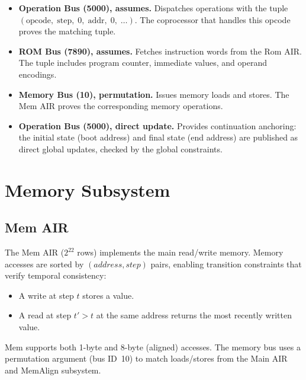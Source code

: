 \begin{itemize}[nosep]
  \item \textbf{Operation Bus (5000), assumes.}
        Dispatches operations with the tuple
        $(\mathrm{opcode},\; \mathrm{step},\; 0,\; \mathrm{addr},\; 0,\; \ldots)$.
        The coprocessor that handles this opcode proves the matching tuple.

  \item \textbf{ROM Bus (7890), assumes.}
        Fetches instruction words from the Rom AIR.
        The tuple includes program counter, immediate values,
        and operand encodings.

  \item \textbf{Memory Bus (10), permutation.}
        Issues memory loads and stores.
        The Mem AIR proves the corresponding memory operations.

  \item \textbf{Operation Bus (5000), direct update.}
        Provides continuation anchoring: the initial state (boot address)
        and final state (end address) are published as direct global updates,
        checked by the global constraints.
\end{itemize}

\section{Memory Subsystem}
\label{sec:memory}

\subsection{Mem AIR}
\label{sec:mem}

The Mem AIR ($2^{22}$ rows) implements the main read/write memory.
Memory accesses are sorted by $(address, step)$ pairs,
enabling transition constraints that verify temporal consistency:
\begin{itemize}[nosep]
  \item A write at step $t$ stores a value.
  \item A read at step $t' > t$ at the same address returns the most recently written value.
\end{itemize}

Mem supports both 1-byte and 8-byte (aligned) accesses.
The memory bus uses a permutation argument (bus ID~10) to match
loads/stores from the Main AIR and MemAlign subsystem.


